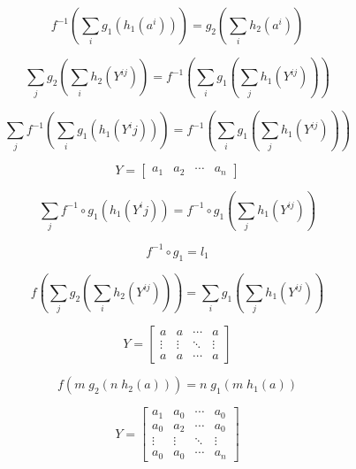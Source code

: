 \documentclass[sn-mathphys-num]{sn-jnl}%
\theoremstyle{thmstyleone}%
\theoremstyle{thmstyletwo}%
\theoremstyle{thmstylethree}%
\begin{document}
\begin{appendices}
\begin{equation}
    f^{-1} \left( \sum_i g_1\left( h_1(a^i) \right) \right)
    = g_2\left( \sum_ih_2(a^{i}) \right)
\end{equation}

\begin{equation}
    \sum_j g_2\left( \sum_i h_2(Y^{ij}) \right)
    = f^{-1} \left( \sum_i g_1\left( \sum_j h_1(Y^{ij}) \right) \right)
\end{equation}

\begin{equation}
    \sum_j f^{-1} \left( \sum_i g_1\left( h_1(Y^ij) \right) \right)
    = f^{-1} \left( \sum_i g_1\left( \sum_j h_1(Y^{ij}) \right) \right)
\end{equation}

\begin{equation}
    Y = \begin{bmatrix}
        a_1 & a_2 & \cdots & a_n
    \end{bmatrix}
\end{equation}

\begin{equation}
    \sum_j f^{-1} \circ g_1\left( h_1(Y^ij) \right)
    = f^{-1} \circ g_1\left( \sum_j h_1(Y^{ij}) \right)
\end{equation}


\begin{equation}
    f^{-1} \circ  g_1 = l_1
\end{equation}



\begin{equation}
    f \left( \sum_j g_2\left( \sum_i h_2(Y^{ij}) \right) \right)
    = \sum_i g_1\left( \sum_j h_1(Y^{ij}) \right)
\end{equation}

\begin{equation}
    Y = \begin{bmatrix}
        a & a & \cdots & a \\
        \vdots & \vdots & \ddots & \vdots \\
        a & a & \cdots & a
    \end{bmatrix}
\end{equation}

\begin{equation}
    f \left( m \; g_2\left( n\; h_2(a) \right) \right)
    = n\; g_1\left( m \; h_1(a) \right)
\end{equation}

\begin{equation}
    Y = \begin{bmatrix}
        a_1 & a_0 & \cdots & a_0 \\
        a_0 & a_2 & \cdots & a_0 \\
        \vdots & \vdots & \ddots & \vdots \\
        a_0 & a_0 & \cdots & a_n
    \end{bmatrix}
\end{equation}


\end{appendices}
\end{document}
